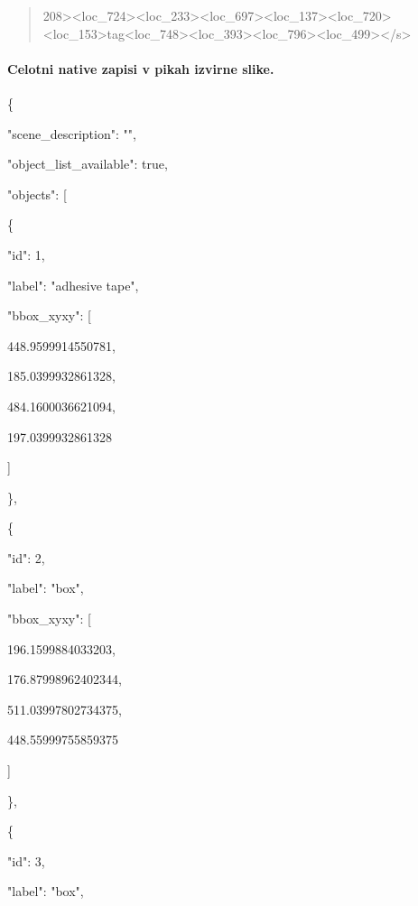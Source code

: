 \documentclass[10pt,a4paper]{article}
\begin{document}
\begin{quote}
208>\allowbreak{}<loc\_724>\allowbreak{}<loc\allowbreak{}\_233>\allowbreak{}<loc\_697>\allowbreak{}<loc\_137>\allowbreak{}<loc\_720>\allowbreak{}\allowbreak{}<loc\_153>\allowbreak{}tag<loc\_748>\allowbreak{}<loc\_393>\allowbreak{}<l\allowbreak{}oc\_796>\allowbreak{}<loc\_499>\allowbreak{}</s>\allowbreak{}
\end{quote}
\paragraph{Celotni native zapisi v pikah izvirne slike.}
\{\par
  "scene\_description":\allowbreak{} "",\allowbreak{}\par
  "object\_list\_available":\allowbreak{} true,\allowbreak{}\par
  "objects":\allowbreak{} [\par
    \{\par
      "id":\allowbreak{} 1,\allowbreak{}\par
      "label":\allowbreak{} "adhesive tape",\allowbreak{}\par
      "bbox\_xyxy":\allowbreak{} [\par
        448.9599914550781,\allowbreak{}\par
        185.0399932861328,\allowbreak{}\par
        484.1600036621094,\allowbreak{}\par
        197.0399932861328\par
      ]\par
    \},\allowbreak{}\par
    \{\par
      "id":\allowbreak{} 2,\allowbreak{}\par
      "label":\allowbreak{} "box",\allowbreak{}\par
      "bbox\_xyxy":\allowbreak{} [\par
        196.1599884033203,\allowbreak{}\par
        176.87998962402344,\allowbreak{}\par
        511.03997802734375,\allowbreak{}\par
        448.55999755859375\par
      ]\par
    \},\allowbreak{}\par
    \{\par
      "id":\allowbreak{} 3,\allowbreak{}\par
      "label":\allowbreak{} "box",\allowbreak{}\par
\end{document}

